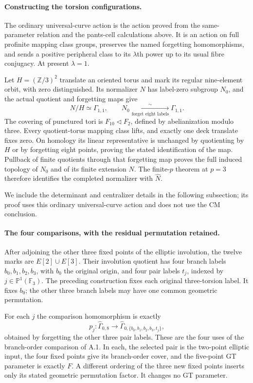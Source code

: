 \paragraph{Constructing the torsion configurations.}
The ordinary universal-curve action is the action proved from the
same-parameter relation and the pants-cell calculations above. It is
an action on full profinite mapping class groups, preserves the named
forgetting homomorphisms, and sends a positive peripheral class to its
$\lambda$th power up to its usual fibre conjugacy. At present
$\lambda=1$.

Let $H=(\mathbb Z/3)^2$ translate an oriented torus and mark its regular
nine-element orbit, with zero distinguished. Its normalizer $N$ has
label-zero subgroup $N_0$, and the actual quotient and forgetting maps
give
\[
 N/H\simeq\Gamma_{1,1},\qquad
 N_0\xrightarrow[\text{forget eight labels}]{\sim}\Gamma_{1,1}.
 \tag{A.C4}
\]
The covering of punctured tori is $F_{10}\triangleleft F_2$, defined
by abelianization modulo three. Every quotient-torus mapping class
lifts, and exactly one deck translate fixes zero. On homology its
linear representative is unchanged by quotienting by $H$ or by
forgetting eight points, proving the stated identification of the
map. Pullback of finite quotients through that forgetting map proves
the full induced topology of $N_0$ and of its finite extension $N$.
The finite-$p$ theorem at $p=3$ therefore identifies the completed
normalizer with $\widehat N$.

We include the determinant and centralizer details in the following
subsection; its proof uses this ordinary universal-curve action and
does not use the CM conclusion.


\paragraph{The four comparisons, with the residual permutation retained.}
After adjoining the other three fixed points of the elliptic
involution, the twelve marks are $E[2]\cup E[3]$. Their involution
quotient has four branch labels $b_0,b_1,b_2,b_3$, with $b_0$ the
original origin, and four pair labels $t_j$, indexed by
$j\in\mathbb P^1(\mathbb F_3)$. The preceding construction fixes
each original three-torsion label. It fixes $b_0$; the other three
branch labels may have one common geometric permutation.

For each $j$ the comparison homomorphism is exactly
\[
 p_j:\widehat\Gamma_{0,8}\longrightarrow
 \widehat\Gamma_{0,\{b_0,b_1,b_2,b_3,t_j\}},
 \tag{A.C5}
\]
obtained by forgetting the other three pair labels. These are the
four uses of the branch-order comparison of A.1. In each, the
selected pair is the two-point elliptic input, the four fixed points
give its branch-order cover, and the five-point GT parameter is
exactly $F$. A different ordering of the three new fixed points
inserts only its stated geometric permutation factor. It changes
no GT parameter.

